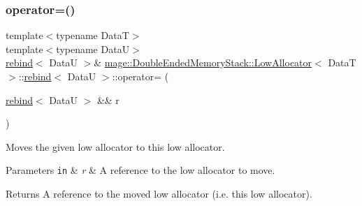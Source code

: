 \subsubsection{\texorpdfstring{operator=()}{operator=()}\hspace{0.1cm}{\footnotesize\ttfamily [2/2]}}
{\footnotesize\ttfamily template$<$typename DataT$>$ \\
template$<$typename DataU$>$ \\
\hyperlink{structmage_1_1_double_ended_memory_stack_1_1_low_allocator_1_1rebind}{rebind}$<$ DataU $>$\& \hyperlink{structmage_1_1_double_ended_memory_stack_1_1_low_allocator}{mage\+::\+Double\+Ended\+Memory\+Stack\+::\+Low\+Allocator}$<$ DataT $>$\+::\hyperlink{structmage_1_1_double_ended_memory_stack_1_1_low_allocator_1_1rebind}{rebind}$<$ DataU $>$\+::operator= (\begin{DoxyParamCaption}\item[{\hyperlink{structmage_1_1_double_ended_memory_stack_1_1_low_allocator_1_1rebind}{rebind}$<$ DataU $>$ \&\&}]{r }\end{DoxyParamCaption})\hspace{0.3cm}{\ttfamily [delete]}}

Moves the given low allocator to this low allocator.


\begin{DoxyParams}[1]{Parameters}
\mbox{\tt in}  & {\em r} & A reference to the low allocator to move. \\
\hline
\end{DoxyParams}
\begin{DoxyReturn}{Returns}
A reference to the moved low allocator (i.\+e. this low allocator). 
\end{DoxyReturn}
